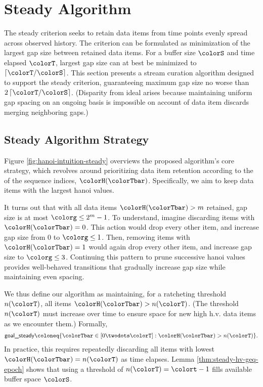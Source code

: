 \section{Steady Algorithm} \label{sec:steady}

The steady criterion seeks to retain data items from time points evenly spread across observed history.
The criterion can be formulated as minimization of the largest gap size between retained data items.
For a buffer size $\colorS$ and time elapsed $\colorT$, largest gap size can at best be minimized to $\left\lceil \colorT / \colorS \right\rceil$.
This section presents a stream curation algorithm designed to support the steady criterion, guaranteeing maximum gap size no worse than $2\left\lceil \colorT / \colorS \right\rceil$.
(Disparity from ideal arises because maintaining uniform gap spacing on an ongoing basis is impossible on account of data item discards merging neighboring gaps.)

\subsection{Steady Algorithm Strategy}
\label{sec:steady-strategy}

Figure \ref{fig:hanoi-intuition-steady} overviews the proposed algorithm's core strategy, which revolves around prioritizing data item retention according to the \hv{} of the sequence indices, $\colorH(\colorTbar)$.
Specifically, we aim to keep data items with the largest hanoi values.

It turns out that with all data items $\colorH(\colorTbar) > m$ retained, gap size is at most $\colorg \leq 2^m - 1$.
To understand, imagine discarding items with $\colorH(\colorTbar) = 0$.
This action would drop every other item, and increase gap size from 0 to $\colorg \leq 1$.
Then, removing items with $\colorH(\colorTbar) = 1$ would again drop every other item, and increase gap size to $\colorg \leq 3$.
Continuing this pattern to prune successive hanoi values provides well-behaved transitions that gradually increase gap size while maintaining even spacing.

We thus define our algorithm as maintaining, for a ratcheting threshold $n(\colorT)$, all items $\colorH(\colorTbar) > n(\colorT)$.
(The threshold $n(\colorT)$ must increase over time to ensure space for new high h.v. data items as we encounter them.)
Formally,
\begin{align*}
\textsf{goal\_steady}
\coloneq \{
\colorTbar \in [0 \twodots \colorT]
: \colorH(\colorTbar) > n(\colorT)
\}.
\end{align*}
In practice, this requires repeatedly discarding all items with lowest \hv{} $\colorH(\colorTbar) = n(\colorT)$ as time elapses.
Lemma \ref{thm:steady-hv-geq-epoch} shows that using a threshold of $n(\colorT) = \colort - 1$ fills available buffer space $\colorS$.%

